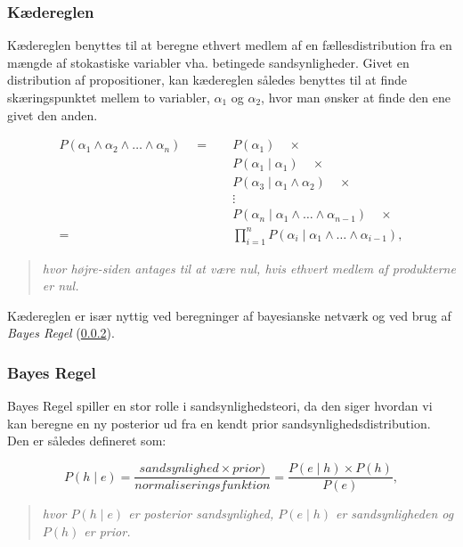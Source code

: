 \subsubsection{Kædereglen}
Kædereglen benyttes til at beregne ethvert medlem af en fællesdistribution fra en mængde af stokastiske variabler vha. betingede sandsynligheder. 
Givet en distribution af propositioner, kan kædereglen således benyttes til at finde skæringspunktet mellem to variabler, $\alpha_1$ og $\alpha_2$, hvor man ønsker at finde den ene givet den anden.

\begin{align*}
P(\alpha_1 \wedge \alpha_2 \wedge \ldots \wedge \alpha_n) \quad = \quad & P(\alpha_1) \quad \times\\
& P(\alpha_1 \mid \alpha_1) \quad \times\\
& P(\alpha_3 \mid \alpha_1 \wedge \alpha_2) \quad \times\\
& \vdots \\
& P(\alpha_n \mid \alpha_1 \wedge \dots \wedge \alpha_{n-1}) \quad \times\\
= \quad &\prod_{i = 1}^{n} P(\alpha_i \mid \alpha_1 \wedge \dots \wedge \alpha_{i-1}),
\end{align*}
\begin{quotation}
\textit{hvor højre-siden antages til at være nul, hvis ethvert medlem af produkterne er nul.}
\end{quotation}

Kædereglen er især nyttig ved beregninger af bayesianske netværk og ved brug af \textit{Bayes Regel} (\cref{sandsynlighed:bayes_regel}).


\subsubsection{Bayes Regel}\label{sandsynlighed:bayes_regel}
Bayes Regel spiller en stor rolle i sandsynlighedsteori, da den siger hvordan vi kan beregne en ny posterior ud fra en kendt prior sandsynlighedsdistribution.
Den er således defineret som:

$$P(h \mid e) = \frac{\mathit{sandsynlighed} \times \mathit{prior})}{\mathit{normaliseringsfunktion}} = \frac{P(e \mid h) \times P(h)}{P(e)},$$

\begin{quotation}
\textit{hvor $P(h \mid e)$ er posterior sandsynlighed, $P(e \mid h)$ er sandsynligheden og $P(h)$ er prior.}
\end{quotation}

